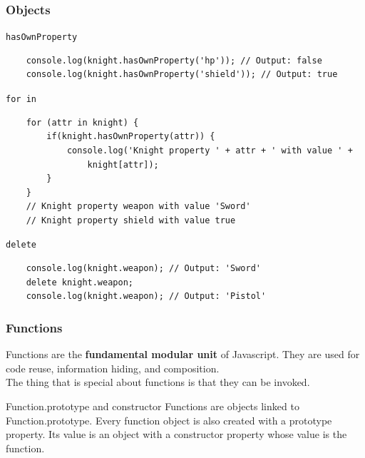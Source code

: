\begin{frame}[fragile]
  \frametitle{Objects}
  \begin{block}{\texttt{hasOwnProperty}}
    {\scriptsize
    \begin{verbatim}
    console.log(knight.hasOwnProperty('hp')); // Output: false
    console.log(knight.hasOwnProperty('shield')); // Output: true
    \end{verbatim}
    }
  \end{block}

  \pause

  \begin{block}{\texttt{for in}}
    {\scriptsize
    \begin{verbatim}
    for (attr in knight) {
        if(knight.hasOwnProperty(attr)) {
            console.log('Knight property ' + attr + ' with value ' + 
                knight[attr]);  
        }
    }
    // Knight property weapon with value 'Sword'
    // Knight property shield with value true
    \end{verbatim}
    }
  \end{block}
  
  \pause

  \begin{block}{\texttt{delete}}
    {\scriptsize
    \begin{verbatim}
    console.log(knight.weapon); // Output: 'Sword'
    delete knight.weapon;
    console.log(knight.weapon); // Output: 'Pistol'
    \end{verbatim}
    }
  \end{block}
\end{frame}

\begin{frame}[fragile]
  \frametitle{Functions}

  Functions are the \textbf{fundamental modular unit} of Javascript. They are used for code reuse, information hiding, and composition. \\

  The thing that is special about functions is that they can be invoked.
  \pause

  \begin{block}{Function.prototype and constructor}
  Functions are objects linked to Function.prototype. Every function object is also created with a prototype property. Its value is an object with a constructor property whose value is the function.
  \end{block}

  \pause
\end{frame}

